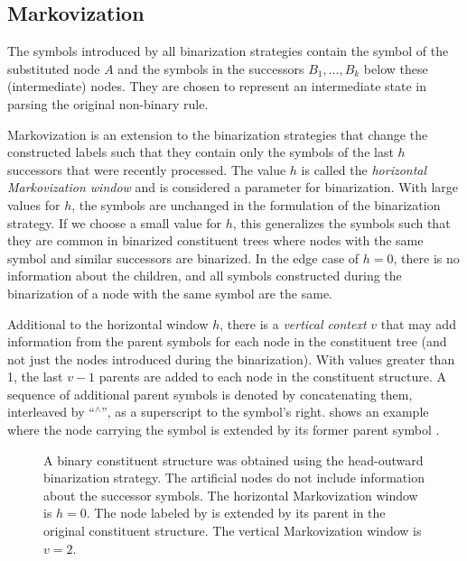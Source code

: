 \documentclass[../../document.tex]{subfiles}
\begin{document}
    \subsection{Markovization}
    The symbols introduced by all binarization strategies contain the symbol of the substituted node \(A\) and the symbols in the successors \(B_1, \ldots, B_k\) below these (intermediate) nodes.
    They are chosen to represent an intermediate state in parsing the original non-binary rule.

    Markovization is an extension to the binarization strategies that change the constructed labels such that they contain only the symbols of the last \(h\) successors that were recently processed.
    The value \(h\) is called the \emph{horizontal Markovization window} and is considered a parameter for binarization.
    With large values for \(h\), the symbols are unchanged in the formulation of the binarization strategy.
    If we choose a small value for \(h\), this generalizes the symbols such that they are common in binarized constituent trees where nodes with the same symbol and similar successors are binarized.
    In the edge case of \(h=0\), there is no information about the children, and all symbols constructed during the binarization of a node with the same symbol are the same.

    Additional to the horizontal window \(h\), there is a \emph{vertical context} \(v\) that may add information from the parent symbols for each node in the constituent tree (and not just the nodes introduced during the binarization).
    With values greater than 1, the last \(v-1\) parents are added to each node in the constituent structure.
    A sequence of additional parent symbols is denoted by concatenating them, interleaved by ``$^\wedge$'', as a superscript to the symbol's right.
     shows an example where the node carrying the symbol  is extended by its former parent symbol .

    \begin{figure}
        \centering
        
        \caption{\label{fig:ex:markovization}
            A binary constituent structure was obtained using the head-outward binarization strategy.
            The artificial nodes do not include information about the successor symbols. The horizontal Markovization window is \(h = 0\).
            The node labeled by \label{np} is extended by its parent in the original constituent structure. The vertical Markovization window is \(v = 2\).}
    \end{figure}
\end{document}
